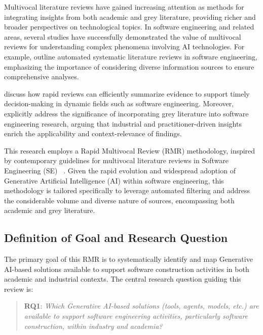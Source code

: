 Multivocal literature reviews have gained increasing attention as methods for integrating insights from both academic and grey literature, providing richer and broader perspectives on technological topics. In software engineering and related areas, several studies have successfully demonstrated the value of multivocal reviews for understanding complex phenomena involving AI technologies. For example, \cite{felizardo2020automating} outline automated systematic literature reviews in software engineering, emphasizing the importance of considering diverse information sources to ensure comprehensive analyses.

\cite{cartaxo2020rapid} discuss how rapid reviews can efficiently summarize evidence to support timely decision-making in dynamic fields such as software engineering. Moreover, \cite{garousi2020grey} explicitly address the significance of incorporating grey literature into software engineering research, arguing that industrial and practitioner-driven insights enrich the applicability and context-relevance of findings.

This research employs a Rapid Multivocal Review (RMR) methodology, inspired by contemporary guidelines for multivocal literature reviews in Software Engineering (SE) ~\cite{cartaxo2020rapid,felizardo2020automating,garousi2020grey}. Given the rapid evolution and widespread adoption of Generative Artificial Intelligence (AI) within software engineering, this methodology is tailored specifically to leverage automated filtering and address the considerable volume and diverse nature of sources, encompassing both academic and grey literature.

\subsection{Definition of Goal and Research Question}

The primary goal of this RMR is to systematically identify and map Generative AI-based solutions available to support software construction activities in both academic and industrial contexts. The central research question guiding this review is:


\begin{quote}
\textbf{RQ1}: \textit{Which Generative AI-based solutions (tools, agents, models, etc.) are available to support software engineering activities, particularly software construction, within industry and academia?}
\end{quote}

